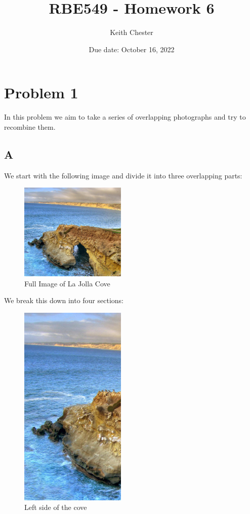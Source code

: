 \documentclass{article}
\title{RBE549 - Homework 6}
\author{Keith Chester}
\date{Due date: October 16, 2022}
\begin{document}
\maketitle

\section*{Problem 1}

In this problem we aim to take a series of overlapping photographs and try to recombine them.

\subsection*{A}

We start with the following image and divide it into three overlapping parts:

\begin{figure}[H]
    \centering
    \includegraphics[width = 0.45\textwidth]{imgs/cove_full.jpg}
    \caption{Full Image of La Jolla Cove}
    \label{fig:prob1-afull}
\end{figure}

We break this down into four sections:

\begin{figure}[H]
    \centering
    \includegraphics[width = 0.45\textwidth]{imgs/cove_left.png}
    \caption{Left side of the cove}
    \label{fig:prob1-aleft}
\end{figure}
\end{document}
